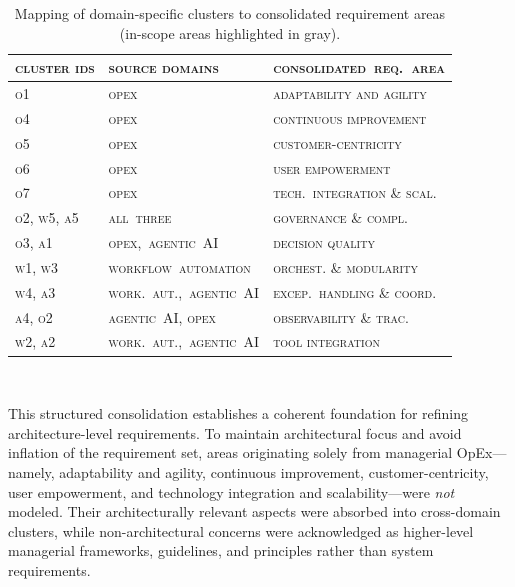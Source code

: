 \begin{table}[H]
  \centering
  \begin{tabular}{p{2.7cm} p{5cm} p{5.5cm}}
    \toprule
    \textsc{cluster ids} & \textsc{source domains} & \textsc{consolidated~req.~area} \\
    \midrule
    \textsc{o1} & \textsc{opex} & \textsc{adaptability and agility} \\
    \textsc{o4} & \textsc{opex} & \textsc{continuous improvement} \\
    \textsc{o5} & \textsc{opex} & \textsc{customer-centricity} \\
    \textsc{o6} & \textsc{opex} & \textsc{user empowerment} \\
    \textsc{o7} & \textsc{opex}& \textsc{tech.~integration \& scal.} \\
    \rowcolor{gray!12}\textsc{o2, w5, a5} & \textsc{all~three} & \textsc{governance \& compl.} \\
    \rowcolor{gray!12}\textsc{o3, a1} & \textsc{opex,~agentic~AI} & \textsc{decision quality} \\
    \rowcolor{gray!12}\textsc{w1, w3} & \textsc{workflow~automation} & \textsc{orchest. \& modularity} \\
    \rowcolor{gray!12}\textsc{w4, a3} & \textsc{work.~aut.,~agentic~AI} & \textsc{excep.~handling \& coord.} \\
    \rowcolor{gray!12}\textsc{a4, o2} & \textsc{agentic~AI, opex} & \textsc{observability \& trac.} \\
    \rowcolor{gray!12}\textsc{w2, a2} & \textsc{work.~aut.,~agentic~AI} & \textsc{tool integration} \\
    \bottomrule
  \end{tabular}
  \caption{Mapping of domain-specific clusters to consolidated requirement areas (in-scope areas highlighted in gray).}~\label{tab:req-clustering}
\end{table}

This structured consolidation establishes a coherent foundation for refining \\ architecture-level requirements. To maintain architectural focus and avoid inflation of the requirement set, areas originating solely from managerial OpEx—namely, adaptability and agility, continuous improvement, customer-centricity, user empowerment, and technology integration and scalability—were \emph{not} modeled. Their architecturally relevant aspects were absorbed into cross-domain clusters, while non-architectural concerns were acknowledged as higher-level managerial frameworks, guidelines, and principles rather than system requirements.


